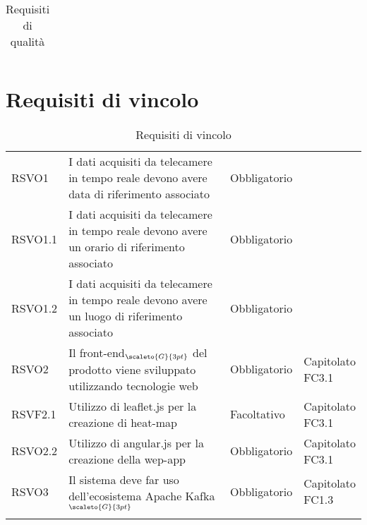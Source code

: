 {{\begin{center}
\begin{longtable}{|p{4cm}|p{4cm}|p{4cm}|p{3cm}|}
		\caption[Requisiti di qualità]{Requisiti di qualità}\label{4.2}\\
		\end{longtable}
\end{center}

\newpage
\section{Requisiti di vincolo}\label{RequisitiVincolo}
\def\tabularxcolumn#1{m{#1}}
{
	
\begin{center}
	\renewcommand{\arraystretch}{1.4}
	\begin{longtable}{|p{4cm}|p{4cm}|p{4cm}|p{3cm}|}
		\hline
		\rowcolor{airforceblue}
		\makecell[c]{\textbf{Codice RS}} & \makecell[c]{\textbf{Descrizione}} & \makecell[c]{\textbf{Tipo di requisito}} & \makecell[c]{\textbf{Fonte}} \\
		\hline
		RSVO1  & I dati acquisiti da telecamere in tempo reale devono avere data di riferimento associato  &Obbligatorio & \makecell[c]{Interno} \\
		\hline
		RSVO1.1  & I dati acquisiti da telecamere in tempo reale devono avere un orario di riferimento associato &Obbligatorio & \makecell[c]{Interno} \\
		\hline
		RSVO1.2  & I dati acquisiti da telecamere in tempo reale devono avere un luogo di riferimento associato &Obbligatorio  & \makecell[c]{Interno} \\
		\hline
		RSVO2  & Il front-end$_{\scaleto{G}{3pt}}$ del prodotto viene sviluppato utilizzando tecnologie web &Obbligatorio  & \makecell[c]{Capitolato\\FC3.1} \\
		\hline
		RSVF2.1  & Utilizzo di leaflet.js per la creazione di heat-map & Facoltativo & \makecell[c]{Capitolato\\FC3.1} \\
		\hline
		RSVO2.2  & Utilizzo di angular.js per la creazione della wep-app  & Obbligatorio  & \makecell[c]{Capitolato\\FC3.1} \\
		\hline
		RSVO3  & Il sistema deve far uso dell'ecosistema Apache Kafka$_{\scaleto{G}{3pt}}$ & Obbligatorio  & \makecell[c]{Capitolato\\FC1.3} \\
		\hline
		\rowcolor{white}
		
		\caption[Requisiti di vincolo]{Requisiti di vincolo}\label{4.3}\\
	\end{longtable}
\end{center}
\newpage
}}}
